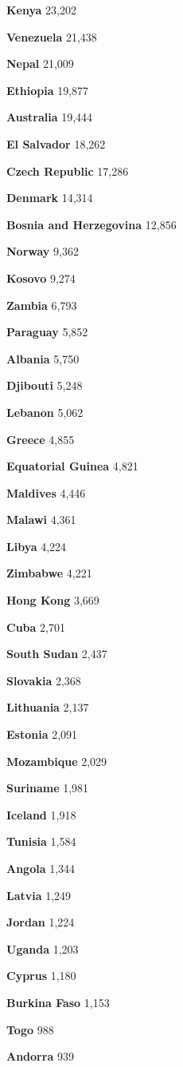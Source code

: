 \textbf{Kenya} 23,202

\textbf{Venezuela} 21,438

\textbf{Nepal} 21,009

\textbf{Ethiopia} 19,877

\textbf{Australia} 19,444

\textbf{El Salvador} 18,262

\textbf{Czech Republic} 17,286

\textbf{Denmark} 14,314

\textbf{Bosnia and Herzegovina} 12,856

\textbf{Norway} 9,362

\textbf{Kosovo} 9,274

\textbf{Zambia} 6,793

\textbf{Paraguay} 5,852

\textbf{Albania} 5,750

\textbf{Djibouti} 5,248

\textbf{Lebanon} 5,062

\textbf{Greece} 4,855

\textbf{Equatorial Guinea} 4,821

\textbf{Maldives} 4,446

\textbf{Malawi} 4,361

\textbf{Libya} 4,224

\textbf{Zimbabwe} 4,221

\textbf{Hong Kong} 3,669

\textbf{Cuba} 2,701

\textbf{South Sudan} 2,437

\textbf{Slovakia} 2,368

\textbf{Lithuania} 2,137

\textbf{Estonia} 2,091

\textbf{Mozambique} 2,029

\textbf{Suriname} 1,981

\textbf{Iceland} 1,918

\textbf{Tunisia} 1,584

\textbf{Angola} 1,344

\textbf{Latvia} 1,249

\textbf{Jordan} 1,224

\textbf{Uganda} 1,203

\textbf{Cyprus} 1,180

\textbf{Burkina Faso} 1,153

\textbf{Togo} 988

\textbf{Andorra} 939

